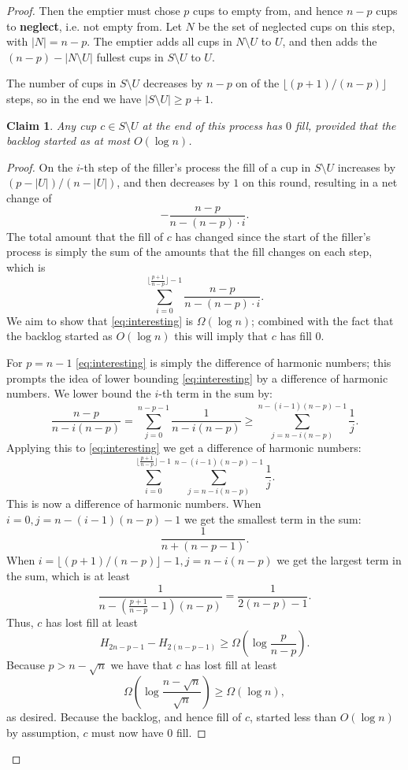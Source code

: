 \documentclass[twocolumn, 10pt]{article}
\newtheorem{clm}{Claim}
\begin{document}
\begin{proof}
Then the emptier must chose $p$ cups to empty from, and hence
$n-p$ cups to \textbf{neglect}, i.e. not empty from. Let $N$ be
the set of neglected cups on this step, with $|N| = n-p$. The
emptier adds all cups in $N \setminus U$ to $U$, and then
adds the $(n-p) - |N\setminus U |$ fullest cups in $S
\setminus U$ to $U$. 

The number of cups in $S\setminus U$ decreases by $n-p$ on of the
$\lfloor (p+1) / (n-p) \rfloor$ steps, so in the end we have
$|S\setminus U| \ge p+1$.

\begin{clm}
  Any cup $c \in S\setminus U$ at the end of this process has $0$
  fill, provided that the backlog started as at most $O(\log n)$.
\end{clm}
\begin{proof}
On the $i$-th step of the filler's process the fill of a
cup in $S \setminus U$ increases by $(p-|U|)/(n-|U|)$, and then
decreases by $1$ on this round, resulting in a net change of
$$-\frac{n-p}{n-(n-p)\cdot i}.$$
The total amount that the fill of $c$ has changed since
the start of the filler's process is simply the sum of the
amounts that the fill changes on each step, which is
\begin{equation}
  \label{eq:interesting}
\sum_{i=0}^{\big\lfloor \frac{p+1}{n-p}\big\rfloor - 1} \frac{n-p}{n-(n-p)\cdot i}.
\end{equation}
We aim to show that \eqref{eq:interesting} is $\Omega(\log n)$; combined
with the fact that the backlog started as $O(\log n)$ this will
imply that $c$ has fill $0$.

For $p=n-1$ \eqref{eq:interesting} is simply the difference of
harmonic numbers; this prompts the idea of lower bounding
\eqref{eq:interesting} by a difference of harmonic numbers.
We lower bound the $i$-th term in the sum by:
$$\frac{n-p}{n-i(n-p)} = \sum_{j=0}^{n-p-1} \frac{1}{n-i(n-p)} \ge \sum_{j=n-i(n-p)}^{n-(i-1)(n-p)-1}\frac{1}{j}.$$
Applying this to \eqref{eq:interesting} we get a difference of
harmonic numbers:
$${\sum_{i=0}^{\big\lfloor\frac{p+1}{n-p}\big\rfloor -
1}}\sum_{j=n-i(n-p)}^{n-(i-1)(n-p)-1} \frac{1}{j}.$$
This is now a difference of harmonic numbers. When $i=0,
j=n-(i-1)(n-p)-1$ we get the smallest term in the sum:
$$\frac{1}{n+(n-p-1)}.$$ 
When $i = \lfloor(p+1) / (n-p)\rfloor - 1, j=n-i(n-p)$ we get the largest
term in the sum, which is at least 
$$\frac{1}{n - \left(\frac{p+1}{n-p} -1\right) (n-p)} =
\frac{1}{2(n-p)-1}.$$
Thus, $c$ has lost fill at least 
$$H_{2n-p-1} - H_{2(n-p-1)} \ge \Omega\left(\log \frac{p}{n-p}\right).$$
Because $p > n-\sqrt{n}$ we have that $c$ has lost fill at least
$$\Omega\left(\log \frac{n-\sqrt{n}}{\sqrt{n}}\right) \ge
\Omega(\log n),$$
as desired. Because the backlog, and hence fill of $c$, started
less than $O(\log n)$ by assumption, $c$ must
now have $0$ fill.
\end{proof}


\end{proof}
\end{document}
